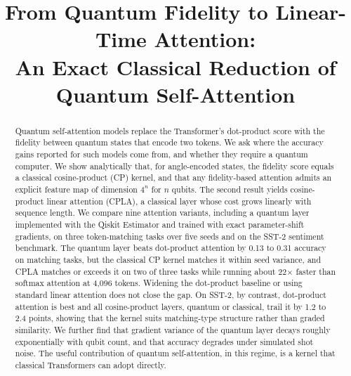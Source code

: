 \documentclass[conference]{IEEEtran}
\newcommand{\cpla}{CPLA}
\begin{document}
\title{From Quantum Fidelity to Linear-Time Attention:\\
An Exact Classical Reduction of Quantum Self-Attention}

\author{
}

\maketitle

\begin{abstract}
Quantum self-attention models replace the Transformer's dot-product score with the fidelity between quantum states that encode two tokens. We ask where the accuracy gains reported for such models come from, and whether they require a quantum computer. We show analytically that, for angle-encoded states, the fidelity score equals a classical cosine-product (CP) kernel, and that any fidelity-based attention admits an explicit feature map of dimension $4^n$ for $n$ qubits. The second result yields cosine-product linear attention (\cpla), a classical layer whose cost grows linearly with sequence length. We compare nine attention variants, including a quantum layer implemented with the Qiskit Estimator and trained with exact parameter-shift gradients, on three token-matching tasks over five seeds and on the SST-2 sentiment benchmark. The quantum layer beats dot-product attention by 0.13 to 0.31 accuracy on matching tasks, but the classical CP kernel matches it within seed variance, and \cpla{} matches or exceeds it on two of three tasks while running about 22$\times$ faster than softmax attention at 4{,}096 tokens. Widening the dot-product baseline or using standard linear attention does not close the gap. On SST-2, by contrast, dot-product attention is best and all cosine-product layers, quantum or classical, trail it by 1.2 to 2.4 points, showing that the kernel suits matching-type structure rather than graded similarity. We further find that gradient variance of the quantum layer decays roughly exponentially with qubit count, and that accuracy degrades under simulated shot noise. The useful contribution of quantum self-attention, in this regime, is a kernel that classical Transformers can adopt directly.
\end{abstract}
\end{document}

